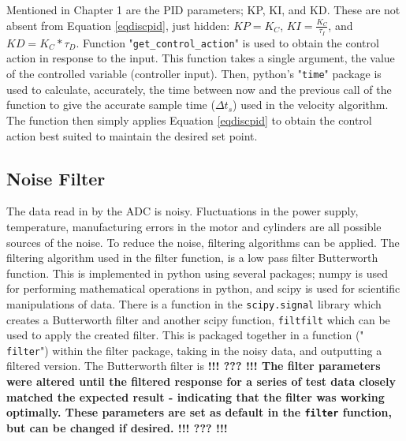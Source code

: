 \documentclass[twoside,a4]{report}
\def\br{\newline \newline \noindent}
\def\cbh{\large\bfseries !!! ??? !!! \normalsize\normalfont}
\begin{document}
	Mentioned in Chapter 1 are the PID parameters; KP, KI, and KD. These are not absent from Equation \ref{eqdiscpid}, just hidden: \(KP = K_C\), \(KI = \frac{K_C}{\tau _I}\), and \(KD = K_C * \tau _D\).\br
	Function "\texttt{get\_control\_action}" is used to obtain the control action in response to the input. This function takes a single argument, the value of the controlled variable (controller input). Then, python's "\texttt{time}" package is used to calculate, accurately, the time between now and the previous call of the function to give the accurate sample time (\(\Delta t_s\)) used in the velocity algorithm. The function then simply applies Equation \ref{eqdiscpid} to obtain the control action best suited to maintain the desired set point.
	
	\subsection*{Noise Filter} %
	The data read in by the ADC is noisy. Fluctuations in the power supply, temperature, manufacturing errors in the motor and cylinders are all possible sources of the noise. To reduce the noise, filtering algorithms can be applied. \br
	The filtering algorithm used in the filter function, is a low pass filter Butterworth function. This is implemented in python using several packages; numpy is used for performing mathematical operations in python, and scipy is used for scientific manipulations of data. \br
	There is a function in the \texttt{scipy.signal} library which creates a Butterworth filter and another scipy function, \texttt{filtfilt} which can be used to apply the created filter. This is packaged together in a function (" \texttt{filter}") within the filter package, taking in the noisy data, and outputting a filtered version. \br
	The Butterworth filter is \cbh \br %
	The filter parameters were altered until the filtered response for a series of test data closely matched the expected result - indicating that the filter was working optimally. These parameters are set as default in the \texttt{filter} function, but can be changed if desired. \cbh %
	
\end{document}
